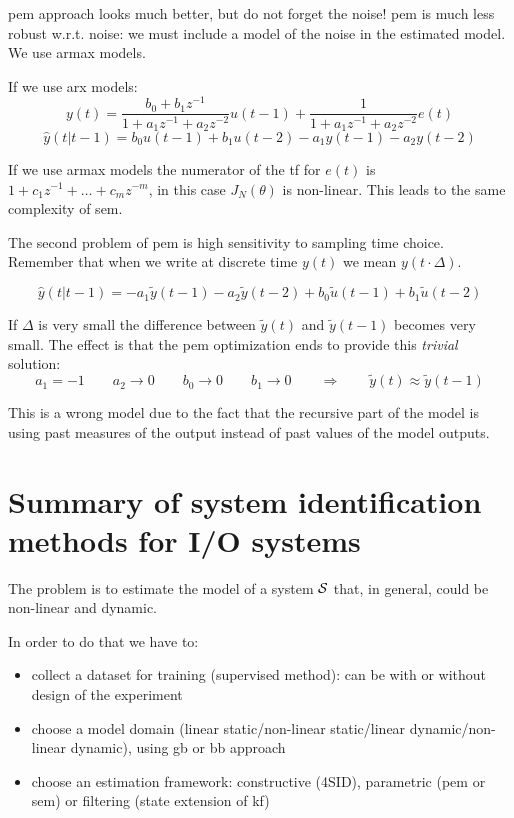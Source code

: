 \gls{pem} approach looks much better, but do not forget the noise! \gls{pem} is much less robust w.r.t. noise: we must include a model of the noise in the estimated model.
We use \gls{armax} models.

If we use \gls{arx} models:
\[
    y(t) = \frac{b_0+b_1z^{-1}}{1+a_1z^{-1}+a_2z^{-2}}u(t-1) + \frac{1}{1+a_1z^{-1}+a_2z^{-2}}e(t)
\]
\[
    \hat{y}(t|t-1) = b_0u(t-1)+b_1u(t-2) - a_1y(t-1)-a_2y(t-2)
\]

If we use \gls{armax} models the numerator of the \gls{tf} for $e(t)$ is $1+c_1z^{-1}+\ldots+c_mz^{-m}$, in this case $J_N(\theta)$ is non-linear.
This leads to the same complexity of \gls{sem}.

The second problem of \gls{pem} is high sensitivity to sampling time choice.
Remember that when we write at discrete time $y(t)$ we mean $y(t\cdot \Delta)$.

\[
    \hat{y}(t|t-1) = -a_1\tilde{y}(t-1)-a_2\tilde{y}(t-2) + b_0\tilde{u}(t-1)+b_1\tilde{u}(t-2)
\]

If $\Delta$ is very small the difference between $\tilde{y}(t)$ and $\tilde{y}(t-1)$ becomes very small.
The effect is that the \gls{pem} optimization ends to provide this \emph{trivial} solution:
\[
    a_1 = -1 \qquad a_2 \rightarrow 0 \qquad b_0 \rightarrow 0 \qquad b_1 \rightarrow 0 \qquad \Rightarrow \qquad \tilde{y}(t) \approx \tilde{y}(t-1)
\]

This is a wrong model due to the fact that the recursive part of the model is using past measures of the output instead of past values of the model outputs.

\section{Summary of system identification methods for I/O systems}

The problem is to estimate the model of a system $\mathcal{S}$ that, in general, could be non-linear and dynamic.
\begin{figure}[H]
    \centering
\end{figure}

In order to do that we have to:
\begin{itemize}
    \item collect a dataset for training (supervised method): can be with or without design of the experiment
    \item choose a model domain (linear static/non-linear static/linear dynamic/non-linear dynamic), using \gls{gb} or \gls{bb} approach
    \item choose an estimation framework: constructive (4SID), parametric (\gls{pem} or \gls{sem}) or filtering (state extension of \gls{kf})
\end{itemize}

